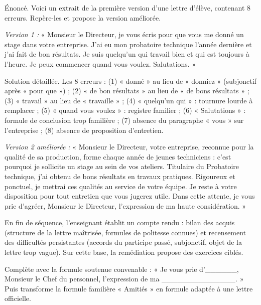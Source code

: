\documentclass[11pt]{article}
\newcommand{\cle}[1]{{\popxbold\color{popdark}#1}}
\newcounter{popsec}
\newcounter{popsub}
\newcommand{\courssub}[1]{%
  \stepcounter{popsub}%
  \par\vspace{9pt}\noindent{\popxbold\fontsize{11.5}{13}\selectfont\color{popink}{\color{poporange}\thepopsec.\thepopsub}\hspace{6pt}#1}\par\nopagebreak\vspace{4pt}
}
\begin{document}
\begin{exoresolu}
Énoncé. Voici un extrait de la première version d'une lettre d'élève, contenant 8 erreurs. Repère-les et propose la version améliorée.

\emph{Version 1 :} « Monsieur le Directeur, je vous écris pour que vous me donné un stage dans votre entreprise. J'ai eu mon probatoire technique l'année dernière et j'ai fait de bon résultats. Je suis quelqu'un qui travail bien et qui est toujours à l'heure. Je peux commencer quand vous voulez. Salutations. »

\tcblower
Solution détaillée. Les 8 erreurs : (1) « donné » au lieu de « donniez » (subjonctif après « pour que ») ; (2) « de bon résultats » au lieu de « de bons résultats » ; (3) « travail » au lieu de « travaille » ; (4) « quelqu'un qui » : tournure lourde à remplacer ; (5) « quand vous voulez » : registre familier ; (6) « Salutations » : formule de conclusion trop familière ; (7) absence du paragraphe « vous » sur l'entreprise ; (8) absence de proposition d'entretien.

\emph{Version 2 améliorée :} « Monsieur le Directeur, votre entreprise, reconnue pour la qualité de sa production, forme chaque année de jeunes techniciens : c'est pourquoi je sollicite un stage au sein de vos ateliers. Titulaire du Probatoire technique, j'ai obtenu de bons résultats en travaux pratiques. Rigoureux et ponctuel, je mettrai ces qualités au service de votre équipe. Je reste à votre disposition pour tout entretien que vous jugerez utile. Dans cette attente, je vous prie d'agréer, Monsieur le Directeur, l'expression de ma haute considération. »
\end{exoresolu}

\courssub{Compte rendu et remédiation}

En fin de séquence, l'enseignant établit un \cle{compte rendu} : bilan des acquis (structure de la lettre maîtrisée, formules de politesse connues) et recensement des difficultés persistantes (accords du participe passé, subjonctif, objet de la lettre trop vague). Sur cette base, la \cle{remédiation} propose des exercices ciblés.

\begin{exercice}
Complète avec la formule soutenue convenable : « Je vous prie d'\_\_\_\_\_\_, Monsieur le Chef du personnel, l'expression de ma \_\_\_\_\_\_\_\_\_\_\_\_\_\_. » Puis transforme la formule familière « Amitiés » en formule adaptée à une lettre officielle.
\end{exercice}
\end{document}
